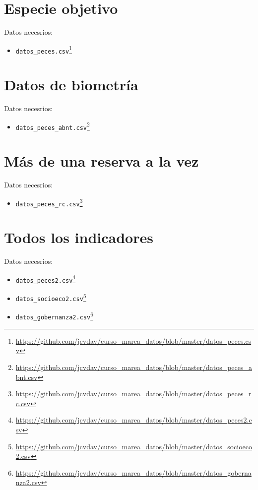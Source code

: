 \documentclass[]{krantz}
\providecommand{\tightlist}{%
  \setlength{\itemsep}{0pt}\setlength{\parskip}{0pt}}
\renewcommand{\href}[2]{#2\footnote{\url{#1}}}
\begin{document}
\hypertarget{especie-objetivo}{%
\section{Especie objetivo}\label{especie-objetivo}}

Datos necesrios:

\begin{itemize}
\tightlist
\item
  \href{https://github.com/jcvdav/curso_marea_datos/blob/master/datos_peces.csv}{\texttt{datos\_peces.csv}}
\end{itemize}

\hypertarget{datos-de-biometria}{%
\section{Datos de biometría}\label{datos-de-biometria}}

Datos necesrios:

\begin{itemize}
\tightlist
\item
  \href{https://github.com/jcvdav/curso_marea_datos/blob/master/datos_peces_abnt.csv}{\texttt{datos\_peces\_abnt.csv}}
\end{itemize}

\hypertarget{mas-de-una-reserva-a-la-vez}{%
\section{Más de una reserva a la vez}\label{mas-de-una-reserva-a-la-vez}}

Datos necesrios:

\begin{itemize}
\tightlist
\item
  \href{https://github.com/jcvdav/curso_marea_datos/blob/master/datos_peces_rc.csv}{\texttt{datos\_peces\_rc.csv}}
\end{itemize}

\hypertarget{todos-los-indicadores}{%
\section{Todos los indicadores}\label{todos-los-indicadores}}

Datos necesrios:

\begin{itemize}
\tightlist
\item
  \href{https://github.com/jcvdav/curso_marea_datos/blob/master/datos_peces2.csv}{\texttt{datos\_peces2.csv}}
\item
  \href{https://github.com/jcvdav/curso_marea_datos/blob/master/datos_socioeco2.csv}{\texttt{datos\_socioeco2.csv}}
\item
  \href{https://github.com/jcvdav/curso_marea_datos/blob/master/datos_gobernanza2.csv}{\texttt{datos\_gobernanza2.csv}}
\end{itemize}
\end{document}
